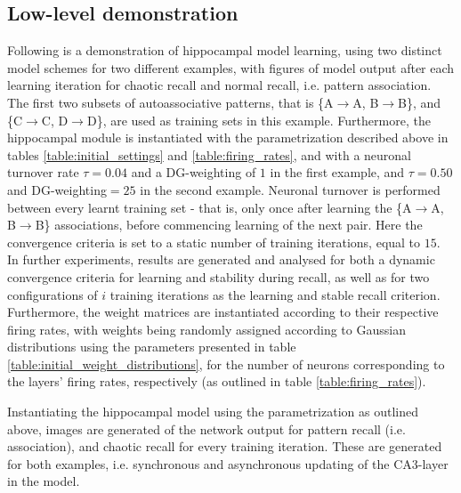 \subsection{Low-level demonstration}
Following is a demonstration of hippocampal model learning, using two distinct model schemes for two different examples, with figures of model output after each learning iteration for chaotic recall and normal recall, i.e. pattern association. The first two subsets of autoassociative patterns, that is \{A$\rightarrow$A, B$\rightarrow$B\}, and \{C$\rightarrow$C, D$\rightarrow$D\}, are used as training sets in this example.
Furthermore, the hippocampal module is instantiated with the parametrization described above in tables \ref{table:initial_settings} and \ref{table:firing_rates}, and with a neuronal turnover rate $\tau = 0.04$ and a DG-weighting of $1$ in the first example, and $\tau=0.50$ and DG-weighting$=25$ in the second example. Neuronal turnover is performed between every learnt training set - that is, only once after learning the \{A$\rightarrow$A, B$\rightarrow$B\} associations, before commencing learning of the next pair. Here the convergence criteria is set to a static number of training iterations, equal to $15$.
In further experiments, results are generated and analysed for both a dynamic convergence criteria for learning and stability during recall, as well as for two configurations of $i$ training iterations as the learning and stable recall criterion. Furthermore, the weight matrices are instantiated according to their respective firing rates, with weights being randomly assigned according to Gaussian distributions using the parameters presented in table \ref{table:initial_weight_distributions}, for the number of neurons corresponding to the layers' firing rates, respectively (as outlined in table \ref{table:firing_rates}).

Instantiating the hippocampal model using the parametrization as outlined above, images are generated of the network output for pattern recall (i.e. association), and chaotic recall for every training iteration. These are generated for both examples, i.e. synchronous and asynchronous updating of the CA3-layer in the model.

